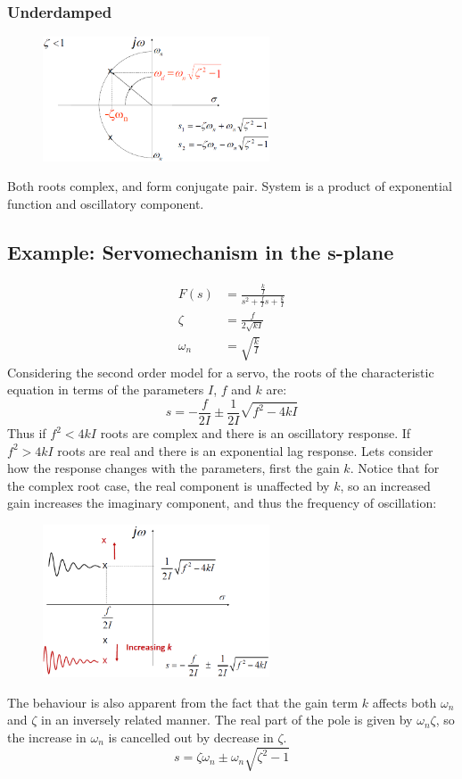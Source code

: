 \documentclass[class=report, crop=false, 12pt,a4paper]{standalone}
\begin{document}
\subsubsection{Underdamped}
\begin{figure}[H]
  \centerline{\includegraphics[width = 0.6\textwidth]{../img/diagram96.png}}
  \caption{}
\end{figure}
Both roots complex, and form conjugate pair. System is a product of exponential function and oscillatory component. 
\subsection{Example: Servomechanism in the s-plane}
\begin{align}
  F(s) &= \frac{\frac{k}{I}}{s^2 + \frac{f}{I}s + \frac{k}{I}}\\
  \zeta &= \frac{f}{2\sqrt{kI}}\\
  \omega_n &= \sqrt{\frac{k}{I}}
\end{align}
Considering the second order model for a servo, the roots of the characteristic equation in terms of the parameters $I$, $f$ and $k$ are: 
\begin{equation}
  s = - \frac{f}{2I} \pm \frac{1}{2I} \sqrt{f^2 - 4kI}
\end{equation}
Thus if $f^2 < 4kI$ roots are complex and there is an oscillatory response. If $f^2 > 4kI$ roots are real and there is an exponential lag response. Lets consider how the response changes with the parameters, first the gain $k$. Notice that for the complex root case, the real component is unaffected by $k$, so an increased gain increases the imaginary component, and thus the frequency of oscillation:
\begin{figure}[H]
  \centerline{\includegraphics[width = 0.6\textwidth]{../img/diagram97.png}}
  \caption{}
\end{figure}
The behaviour is also apparent from the fact that the gain term $k$ affects both $\omega_n$ and $\zeta$ in an inversely related manner. The real part of the pole is given by $\omega_n \zeta$, so the increase in $\omega_n$ is cancelled out by decrease in $\zeta$.
\begin{equation}
  s = \zeta \omega_n \pm \omega_n \sqrt{\zeta^2 - 1}
\end{equation}
\end{document}

